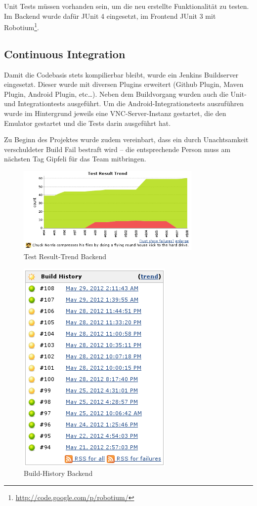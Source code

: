 \documentclass[10pt,a4paper]{scrartcl}
\begin{document}
Unit Tests müssen vorhanden sein, um die neu erstellte Funktionalität zu testen. Im Backend wurde
dafür JUnit 4 eingesetzt, im Frontend JUnit 3 mit
Robotium\footnote{\url{http://code.google.com/p/robotium/}}.

\subsection{Continuous Integration}

Damit die Codebasis stets kompilierbar bleibt, wurde ein Jenkins Buildserver eingesetzt. Dieser
wurde mit diversen Plugins erweitert (Github Plugin, Maven Plugin, Android Plugin, etc\ldots). Neben
dem Buildvorgang wurden auch die Unit- und Integrationtests ausgeführt. Um die
Android-Integrationstests auszuführen wurde im Hintergrund jeweils eine VNC-Server-Instanz
gestartet, die den Emulator gestartet und die Tests darin ausgeführt hat.

Zu Beginn des Projektes wurde zudem vereinbart, dass ein durch Unachtsamkeit verschuldeter Build Fail
bestraft wird -- die entsprechende Person muss am nächsten Tag Gipfeli für das Team mitbringen.

\begin{figure}[H]
	\begin{center}
		\includegraphics[width=0.8\textwidth]{img/jenkins1.png}
	\end{center}
	\caption{Test Result-Trend Backend}
\end{figure}

\begin{figure}[H]
	\begin{center}
		\includegraphics[height=0.7\textwidth]{img/jenkins2.png}
	\end{center}
	\caption{Build-History Backend}
\end{figure}
\end{document}
